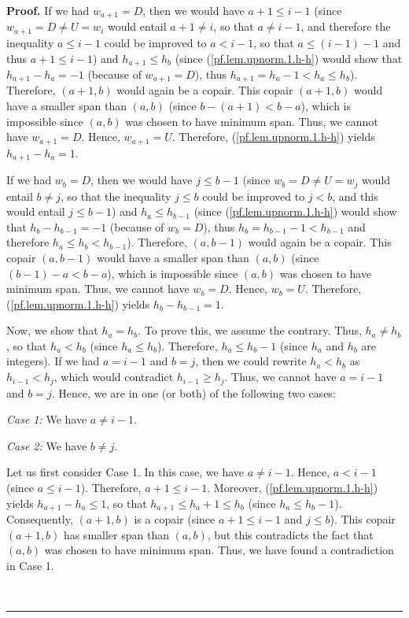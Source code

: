 \documentclass[numbers=enddot,12pt,final,onecolumn,notitlepage]{scrartcl}%
\theoremstyle{definition}
\newenvironment{proof}[1][Proof]{\noindent\textbf{#1.} }{\ \rule{0.5em}{0.5em}}
\newcommand{\tup}[1]{\left( #1 \right)}
\newenvironment{verlong}{}{}
\begin{document}
\begin{verlong}
\begin{proof}
If we had $w_{a+1}=D$, then we would have $a+1\leq i-1$ (since $w_{a+1}=D\neq
U=w_{i}$ would entail $a+1\neq i$, so that $a\neq i-1$, and therefore the
inequality $a\leq i-1$ could be improved to $a<i-1$, so that $a \leq \tup{i-1}-1$ and thus $a+1\leq i-1$)
and $h_{a+1}\leq h_{b}$ (since (\ref{pf.lem.upnorm.1.h-h}) would show that
$h_{a+1}-h_{a}=-1$ (because of $w_{a+1}=D$), thus $h_{a+1}=h_{a}-1<h_{a}\leq
h_{b}$). Therefore, $\left(  a+1,b\right)  $ would again be a copair. This
copair $\left(  a+1,b\right)  $ would have a smaller span than $\left(
a,b\right)  $ (since $b-\tup{a+1} < b-a$), which is impossible since $\left(  a,b\right)  $ was chosen to
have minimum span. Thus, we cannot have $w_{a+1}=D$. Hence, $w_{a+1}=U$.
Therefore, (\ref{pf.lem.upnorm.1.h-h}) yields $h_{a+1}-h_{a}=1$.

If we had $w_{b}=D$, then we would have $j\leq b-1$ (since $w_{b}=D\neq
U=w_{j}$ would entail $b\neq j$, so that the inequality $j\leq b$ could be
improved to $j<b$, and this would entail $j\leq b-1$) and $h_{a}\leq h_{b-1}$
(since (\ref{pf.lem.upnorm.1.h-h}) would show that $h_{b}-h_{b-1}=-1$ (because
of $w_{b}=D$), thus $h_b = h_{b-1} - 1 < h_{b-1}$ and therefore $h_{a}\leq
h_{b}<h_{b-1}$). Therefore, $\left(  a,b-1\right)  $ would again be a copair.
This copair $\left(  a,b-1\right)  $ would have a smaller span than $\left(
a,b\right)  $ (since $\tup{b-1}-a < b-a$), which is impossible since $\left(  a,b\right)  $ was chosen to
have minimum span. Thus, we cannot have $w_{b}=D$. Hence, $w_{b}=U$.
Therefore, (\ref{pf.lem.upnorm.1.h-h}) yields $h_{b}-h_{b-1}=1$.

Now, we show that $h_{a}=h_{b}$. To prove this, we assume the contrary.
Thus, $h_{a}\neq h_{b}$, so that $h_{a}<h_{b}$ (since $h_{a}\leq h_{b}$).
Therefore, $h_{a}\leq h_{b}-1$ (since $h_{a}$ and $h_{b}$ are integers). If we
had $a=i-1$ and $b=j$, then we could rewrite $h_{a}<h_{b}$ as $h_{i-1}<h_{j}$,
which would contradict $h_{i-1}\geq h_{j}$. Thus, we cannot have $a=i-1$ and
$b=j$. Hence, we are in one (or both) of the following two cases:

\textit{Case 1:} We have $a\neq i-1$.

\textit{Case 2:} We have $b\neq j$.

Let us first consider Case 1. In this case, we have $a\neq i-1$. Hence,
$a<i-1$ (since $a\leq i-1$). Therefore, $a+1\leq i-1$. Moreover,
(\ref{pf.lem.upnorm.1.h-h}) yields $h_{a+1}-h_{a}\leq1$, so that $h_{a+1}\leq
h_{a}+1\leq h_{b}$ (since $h_{a}\leq h_{b}-1$). Consequently, $\left(
a+1,b\right)  $ is a copair (since $a+1\leq i-1$ and $j\leq b$). This copair
$\left(  a+1,b\right)  $ has smaller span than $\left(  a,b\right)  $, but
this contradicts the fact that $\left(  a,b\right)  $ was chosen to have
minimum span. Thus, we have found a contradiction in Case 1.


\end{proof}
\end{verlong}
\end{document}
